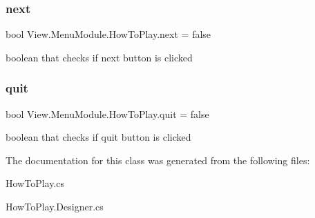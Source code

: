 \subsubsection{\texorpdfstring{next}{next}}
{\footnotesize\ttfamily bool View.\+Menu\+Module.\+How\+To\+Play.\+next = false}

boolean that checks if next button is clicked \hypertarget{class_view_1_1_menu_module_1_1_how_to_play_abd2452f664d2ed8d490175758b1c0806}{}\label{class_view_1_1_menu_module_1_1_how_to_play_abd2452f664d2ed8d490175758b1c0806} 
\subsubsection{\texorpdfstring{quit}{quit}}
{\footnotesize\ttfamily bool View.\+Menu\+Module.\+How\+To\+Play.\+quit = false}

boolean that checks if quit button is clicked 

The documentation for this class was generated from the following files\+:\begin{DoxyCompactItemize}
\item 
How\+To\+Play.\+cs\item 
How\+To\+Play.\+Designer.\+cs\end{DoxyCompactItemize}
